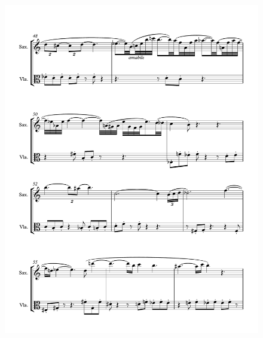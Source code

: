 \begin{figure}[htbp]
    \centering
	\includegraphics[width=6.5in]{figures/Sax_Viola_20.pdf}
\end{figure}

